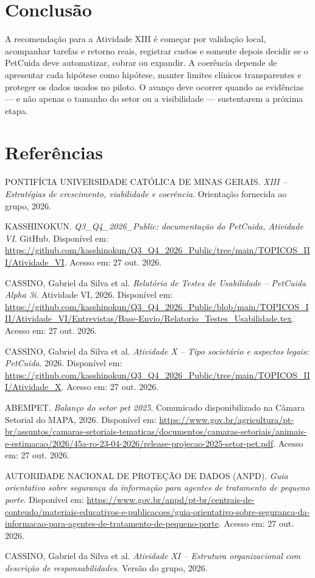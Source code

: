 \documentclass[12pt,a4paper]{article}
\begin{document}
\section{Conclusão}

A recomendação para a Atividade XIII é começar por validação local, acompanhar tarefas e retorno reais, registrar custos e somente depois decidir se o PetCuida deve automatizar, cobrar ou expandir. A coerência depende de apresentar cada hipótese como hipótese, manter limites clínicos transparentes e proteger os dados usados no piloto. O avanço deve ocorrer quando as evidências — e não apenas o tamanho do setor ou a visibilidade — sustentarem a próxima etapa.

\section*{Referências}
\small
\begin{enumerate}[label={[\arabic*]},leftmargin=1.3cm,itemsep=0.25em]
\item PONTIFÍCIA UNIVERSIDADE CATÓLICA DE MINAS GERAIS. \textit{XIII -- Estratégias de crescimento, viabilidade e coerência}. Orientação fornecida ao grupo, 2026.
\item KASSHINOKUN. \textit{Q3\_Q4\_2026\_Public: documentação do PetCuida, Atividade VI}. GitHub. Disponível em: \url{https://github.com/kasshinokun/Q3_Q4_2026_Public/tree/main/TOPICOS_III/Atividade_VI}. Acesso em: 27 out. 2026.
\item CASSINO, Gabriel da Silva et al. \textit{Relatório de Testes de Usabilidade -- PetCuida Alpha 3i}. Atividade VI, 2026. Disponível em: \url{https://github.com/kasshinokun/Q3_Q4_2026_Public/blob/main/TOPICOS_III/Atividade_VI/Entrevistas/Base-Envio/Relatorio_Testes_Usabilidade.tex}. Acesso em: 27 out. 2026.
\item CASSINO, Gabriel da Silva et al. \textit{Atividade X -- Tipo societário e aspectos legais: PetCuida}. 2026. Disponível em: \url{https://github.com/kasshinokun/Q3_Q4_2026_Public/tree/main/TOPICOS_III/Atividade_X}. Acesso em: 27 out. 2026.
\item ABEMPET. \textit{Balanço do setor pet 2025}. Comunicado disponibilizado na Câmara Setorial do MAPA, 2026. Disponível em: \url{https://www.gov.br/agricultura/pt-br/assuntos/camaras-setoriais-tematicas/documentos/camaras-setoriais/animais-e-estimacao/2026/45a-ro-23-04-2026/release-projecao-2025-setor-pet.pdf}. Acesso em: 27 out. 2026.
\item AUTORIDADE NACIONAL DE PROTEÇÃO DE DADOS (ANPD). \textit{Guia orientativo sobre segurança da informação para agentes de tratamento de pequeno porte}. Disponível em: \url{https://www.gov.br/anpd/pt-br/centrais-de-conteudo/materiais-educativos-e-publicacoes/guia-orientativo-sobre-seguranca-da-informacao-para-agentes-de-tratamento-de-pequeno-porte}. Acesso em: 27 out. 2026.
\item CASSINO, Gabriel da Silva et al. \textit{Atividade XI -- Estrutura organizacional com descrição de responsabilidades}. Versão do grupo, 2026.
\end{enumerate}
\normalsize
\end{document}
